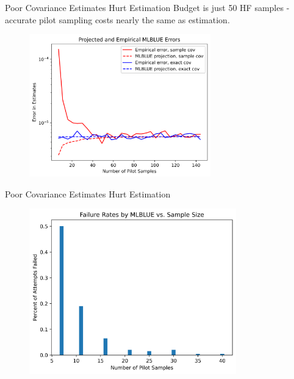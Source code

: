 \documentclass[usenames,dvipsnames]{beamer}
\theoremstyle{definition}
\begin{document}
\begin{frame}{Poor Covariance Estimates Hurt Estimation}
    Budget is just 50 HF samples - accurate pilot sampling costs nearly the same as estimation.
    \begin{figure}
        \centering
        \includegraphics[width=0.7\textwidth]{fig/MLBLUE_errs.png}
        \label{fig:mlblue_errs}
    \end{figure}
\end{frame}

\begin{frame}{Poor Covariance Estimates Hurt Estimation}
    \begin{figure}
        \centering
        \includegraphics[width=0.8\textwidth]{fig/fail_rates.png}
        \label{fig:fail_rates}
    \end{figure}
\end{frame}
\end{document}
